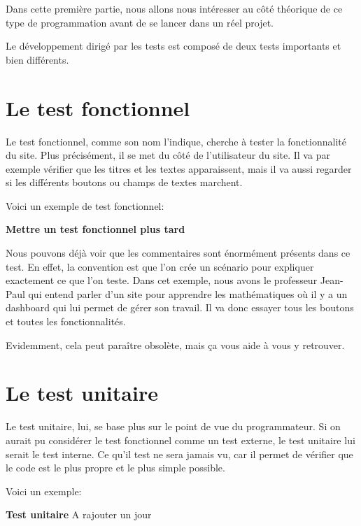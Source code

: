 \documentclass[letterpaper,10pt,french]{sphinxmanual}
\begin{document}
Dans cette première partie, nous allons nous intéresser au côté théorique de ce
type de programmation avant de se lancer dans un réel projet.

Le développement dirigé par les tests est composé de deux tests importants et
bien différents.


\section{Le test fonctionnel}
\label{tdd:le-test-fonctionnel}
Le test fonctionnel, comme son nom l'indique, cherche à tester la fonctionnalité
du site. Plus précisément, il se met du côté de l'utilisateur du site. Il va par
exemple vérifier que les titres et les textes apparaissent, mais il va aussi
regarder si les différents boutons ou champs de textes marchent.

Voici un exemple de test fonctionnel:

\textbf{Mettre un test fonctionnel plus tard}

Nous pouvons déjà voir que les commentaires sont énormément présents dans ce
test. En effet, la convention est que l'on crée un scénario pour expliquer
exactement ce que l'on teste. Dans cet exemple, nous avons le professeur
Jean-Paul qui entend parler d'un site pour apprendre les mathématiques où il y a
un dashboard qui lui permet de gérer son travail. Il va donc essayer
tous les boutons et toutes les fonctionnalités.

Evidemment, cela peut paraître obsolète, mais ça vous aide à vous y retrouver.


\section{Le test unitaire}
\label{tdd:le-test-unitaire}
Le test unitaire, lui, se base plus sur le point de vue du programmateur. Si on
aurait pu considérer le test fonctionnel comme un test externe, le test unitaire
lui serait le test interne. Ce qu'il test ne sera jamais vu, car il permet de
vérifier que le code est le plus propre et le plus simple possible.

Voici un exemple:

\textbf{Test unitaire} A rajouter un jour
\end{document}

